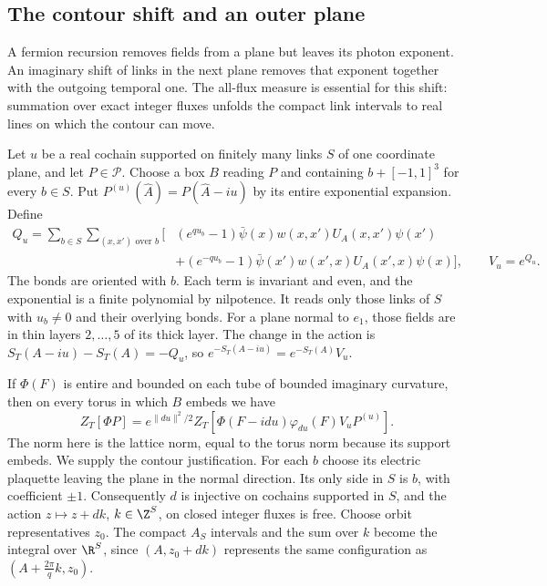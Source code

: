 \subsection{The contour shift and an outer plane}\label{subsec:diag-contour}

A fermion recursion removes fields from a plane but leaves its
photon exponent. An imaginary shift of links in the next plane
removes that exponent together with the outgoing temporal one.
The all-flux measure is essential for this shift: summation over
exact integer fluxes unfolds the compact link intervals to
real lines on which the contour can move.

Let $u$ be a real cochain supported on finitely many links $S$
of one coordinate plane, and let $P\in\mathcal P$. Choose a
box $B$ reading $P$ and containing $b+[-1,1]^3$ for every
$b\in S$. Put $P^{(u)}(\widehat A)=P(\widehat A-iu)$ by
its entire exponential expansion. Define
\begin{equation}\label{eq:diag-shift-fermion-polynomial}
 \begin{split}
 Q_u=\sum_{b\in S}\sum_{(x,x')\text{ over }b}\big[&
 (e^{qu_b}-1)\bar\psi(x)w(x,x')U_A(x,x')\psi(x')\\
 &+(e^{-qu_b}-1)\bar\psi(x')w(x',x)U_A(x',x)\psi(x)\big],
 \qquad V_u=e^{Q_u}.
 \end{split}
\end{equation}
The bonds are oriented with $b$. Each term is invariant and
even, and the exponential is a finite polynomial by nilpotence.
It reads only those links of $S$ with $u_b\ne0$ and their
overlying bonds. For a plane normal to $e_1$, those fields
are in thin layers $2,\ldots,5$ of its thick layer. The change
in the action is $S_T(A-iu)-S_T(A)=-Q_u$, so
$e^{-S_T(A-iu)}=e^{-S_T(A)}V_u$.

If $\Phi(F)$ is entire and bounded on each tube of bounded
imaginary curvature, then on every torus in which $B$ embeds
we have
\begin{equation}\label{eq:diag-contour-identity}
 Z_T[\Phi P]=e^{\|du\|^2/2}
       Z_T[\Phi(F-idu)\varphi_{du}(F)V_uP^{(u)}].
\end{equation}
The norm here is the lattice norm, equal to the torus norm
because its support embeds. We supply the contour justification.
For each $b$ choose its electric plaquette leaving the plane
in the normal direction. Its only side in $S$ is $b$, with
coefficient $\pm1$. Consequently $d$ is injective on cochains
supported in $S$, and the action
$z\mapsto z+dk$, $k\in\Z^S$, on closed integer fluxes is free.
Choose orbit representatives $z_0$. The compact $A_S$ intervals
and the sum over $k$ become the integral over $\R^S$, since
$(A,z_0+dk)$ represents the same configuration as
$(A+\frac{2\pi}{q}k,z_0)$.

